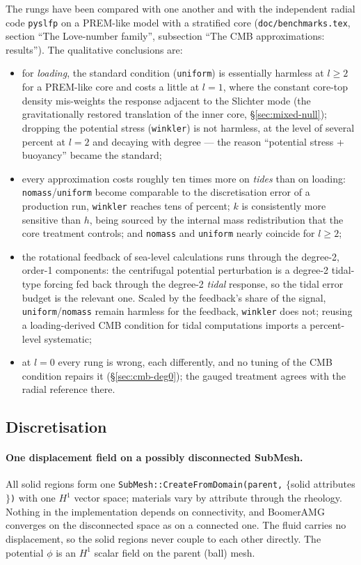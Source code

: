 \documentclass[11pt]{article}
\numberwithin{equation}{section}
\theoremstyle{remark}
\newcommand{\code}[1]{\texttt{#1}}
\begin{document}
The rungs have been compared with one another and with the independent
radial code \code{pyslfp} on a PREM-like model with a stratified core
(\code{doc/benchmarks.tex}, section ``The Love-number family'', subsection
``The CMB approximations: results''). The qualitative conclusions are:
\begin{itemize}
\item for \emph{loading}, the standard condition (\code{uniform}) is
  essentially harmless at $l\ge2$ for a PREM-like core and costs a little
  at $l=1$, where the constant core-top density mis-weights the response
  adjacent to the Slichter mode (the gravitationally restored translation
  of the inner core, \S\ref{sec:mixed-null}); dropping the potential
  stress (\code{winkler}) is not harmless, at the level of several percent
  at $l=2$ and decaying with degree --- the reason ``potential stress +
  buoyancy'' became the standard;
\item every approximation costs roughly ten times more on \emph{tides} than
  on loading: \code{nomass}/\code{uniform} become comparable to the
  discretisation error of a production run, \code{winkler} reaches tens of
  percent; $k$ is consistently more sensitive than $h$, being sourced by
  the internal mass redistribution that the core treatment controls; and
  \code{nomass} and \code{uniform} nearly coincide for $l\ge2$;
\item the rotational feedback of sea-level calculations runs through the
  degree-2, order-1 components: the centrifugal potential perturbation is a
  degree-2 tidal-type forcing fed back through the degree-2 \emph{tidal}
  response, so the tidal error budget is the relevant one. Scaled by the
  feedback's share of the signal, \code{uniform}/\code{nomass} remain
  harmless for the feedback, \code{winkler} does not; reusing a
  loading-derived CMB condition for tidal computations imports a
  percent-level systematic;
\item at $l=0$ every rung is wrong, each differently, and no tuning of
  the CMB condition repairs it (\S\ref{sec:cmb-deg0}); the gauged treatment
  agrees with the radial reference there.
\end{itemize}

\subsection{Discretisation}

\paragraph{One displacement field on a possibly disconnected SubMesh.} All
solid regions form one \code{SubMesh::CreateFromDomain(parent,} $\{$solid
attributes$\}$\code{)} with one $H^1$ vector space; materials vary by attribute
through the rheology. Nothing in the implementation depends on
connectivity, and BoomerAMG converges on the disconnected space as on a
connected one. The fluid carries no displacement, so the solid regions
never couple to each other directly. The potential $\phi$ is an $H^1$
scalar field on the parent (ball) mesh.
\end{document}
